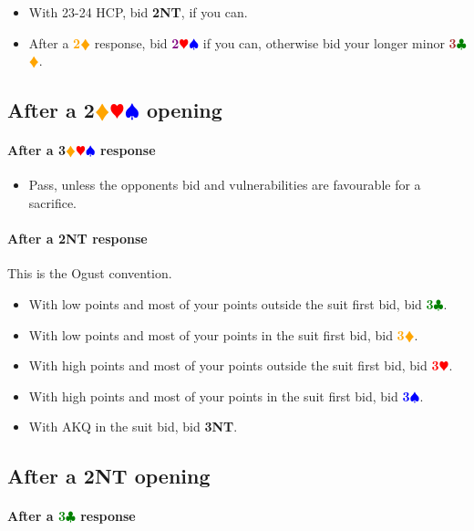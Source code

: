 \documentclass{article}
\newcommand{\Hs}{\textcolor{Red}{$\varheart$}}
\newcommand{\Ss}{\textcolor{Blue}{$\spadesuit$}}
\newcommand{\Ds}{\textcolor{Orange}{$\vardiamond$}}
\newcommand{\Cs}{\textcolor{Green}{$\clubsuit$}}
\newcommand{\NTs}{\textbf{\footnotesize{NT}}}
\renewcommand{\H}[1]{\textcolor{Red}{\textbf{#1}\Hs}}
\renewcommand{\S}[1]{\textcolor{Blue}{\textbf{#1}\Ss}}
\newcommand{\D}[1]{\textcolor{Orange}{\textbf{#1}\Ds}}
\newcommand{\C}[1]{\textcolor{Green}{\textbf{#1}\Cs}}
\newcommand{\NT}[1]{\textbf{#1\NTs}}
\newcommand{\minors}[1]{\textcolor{Brown}{\textbf{#1}}\Cs\Ds}
\newcommand{\majors}[1]{\textcolor{Purple}{\textbf{#1}}\Hs\Ss}
\newcommand{\notclubs}[1]{\textbf{#1}\Ds\Hs\Ss}
\begin{document}
\begin{itemize}
\item With 23-24 HCP, bid \NT{2}, if you can.
\item After a \D{2} response, bid \majors{2} if you can, otherwise bid your longer minor \minors{3}.
\end{itemize}

\subsection{After a \notclubs{2} opening}

\paragraph{After a \notclubs{3} response}
\begin{itemize}
\item Pass, unless the opponents bid and vulnerabilities are favourable for a sacrifice.
\end{itemize}

\paragraph{After a \NT{2} response}

This is the Ogust convention.

\begin{itemize}
\item With low points and most of your points outside the suit first bid, bid \C{3}.
\item With low points and most of your points in the suit first bid, bid \D{3}.
\item With high points and most of your points outside the suit first bid, bid \H{3}.
\item With high points and most of your points in the suit first bid, bid \S{3}.
\item With AKQ in the suit bid, bid \NT{3}.
\end{itemize}

\subsection{After a \NT{2} opening}

\paragraph{After a \C{3} response}
\end{document}
